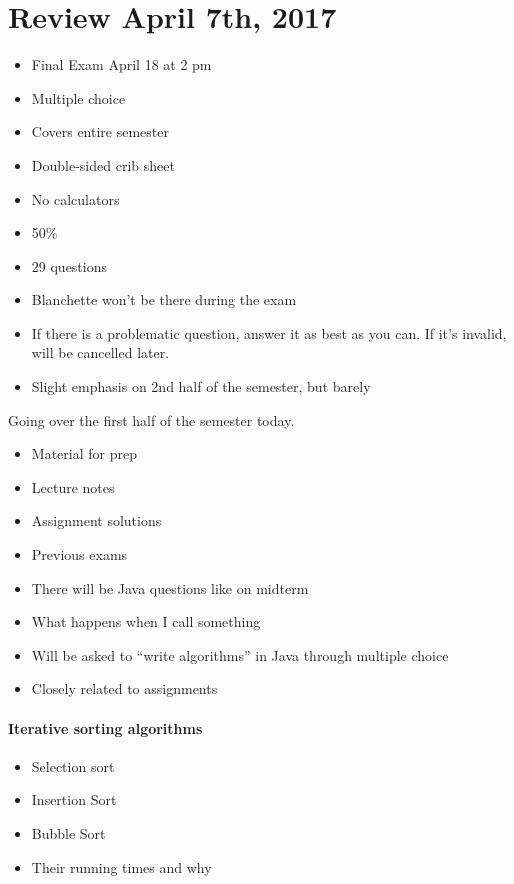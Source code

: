 \documentclass[12 pt]{article}
\theoremstyle{definition}
\begin{document}
\section{Review April 7th, 2017}
\begin{itemize}
\item Final Exam April 18 at 2 pm
\item Multiple choice
\item Covers entire semester
\item Double-sided crib sheet
\item No calculators
\item 50\%
\item 29 questions
\item Blanchette won't be there during the exam
\item If there is a problematic question, answer it as best as you can. If it's invalid, will be cancelled later.
\item Slight emphasis on 2nd half of the semester, but barely
\end{itemize}
Going over the first half of the semester today.
\begin{itemize}
\item Material for prep
\item Lecture notes
\item Assignment solutions
\item Previous exams
\end{itemize}
\begin{itemize}
\item There will be Java questions like on midterm
\item What happens when I call something
\item Will be asked to ``write algorithms'' in Java through multiple choice
  \item Closely related to assignments
\end{itemize}
\paragraph{Iterative sorting algorithms}
\begin{itemize}
\item Selection sort
\item Insertion Sort
\item Bubble Sort
\item Their running times and why
\end{itemize}
\end{document}
